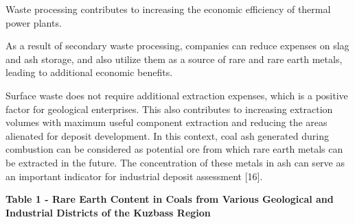 Waste processing contributes to increasing the economic efficiency of
thermal power plants.

As a result of secondary waste processing, companies can reduce expenses
on slag and ash storage, and also utilize them as a source of rare and
rare earth metals, leading to additional economic benefits.

Surface waste does not require additional extraction expenses, which is
a positive factor for geological enterprises. This also contributes to
increasing extraction volumes with maximum useful component extraction
and reducing the areas alienated for deposit development. In this
context, coal ash generated during combustion can be considered as
potential ore from which rare earth metals can be extracted in the
future. The concentration of these metals in ash can serve as an
important indicator for industrial deposit assessment {[}16{]}.

\textbf{Table 1 - Rare Earth Content in Coals from Various Geological
and Industrial Districts of the Kuzbass Region}

